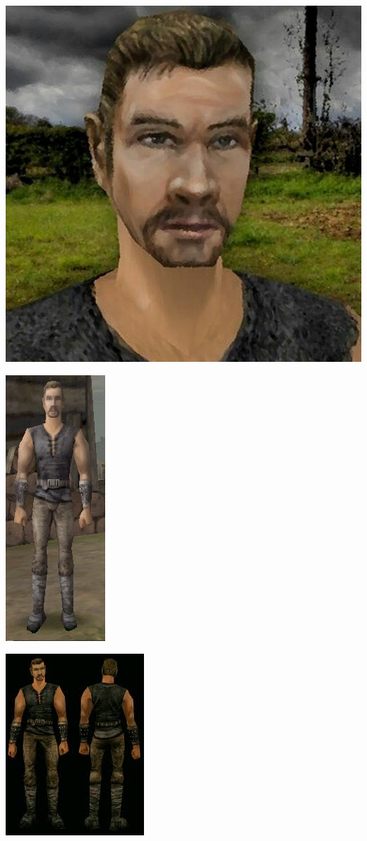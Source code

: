 \documentclass[11pt,polish, openany]{book}
\begin{document}
\begin{center}
\includegraphics[scale=0.37]{bezimienny}
\end{center}


\begin{center}
\includegraphics[scale=2]{bezzimiennybody}
\end{center}


\begin{center}
\includegraphics[scale=2]{bezimiennybody2}
\end{center}
\end{document}
